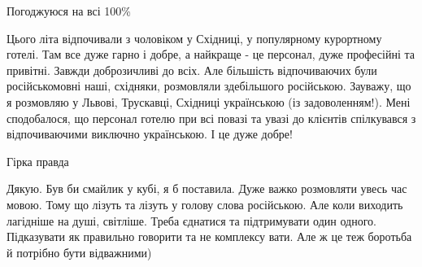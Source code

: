 \begin{itemize}
\begin{itemize}
\end{itemize}

 
Погоджуюся на всі 100\%

 

Цього літа відпочивали з чоловіком у Східниці, у популярному курортному готелі.
Там все дуже гарно і добре, а найкраще - це персонал, дуже професійні та
привітні. Завжди доброзичливі до всіх. Але більшість відпочиваючих були
російськомовні наші, східняки, розмовляли здебільшого російською. Зауважу, що я
розмовляю у Львові, Трускавці, Східниці українською (із задоволенням!). Мені
сподобалося, що персонал готелю при всі повазі та увазі до клієнтів спілкувався
з відпочиваючими виключно українською. І це дуже добре!

 
Гірка правда

 

Дякую. Був би смайлик у кубі, я б поставила. Дуже важко розмовляти увесь час
мовою. Тому що лізуть та лізуть у голову слова російською. Але коли виходить
лагідніше на душі, світліше. Треба єднатися та підтримувати один одного.
Підказувати як правильно говорити та не комплексу вати. Але ж це теж боротьба й
потрібно бути відважними)


 


\end{itemize}
